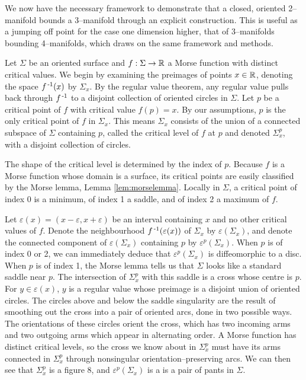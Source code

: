 \label{sec:2bound3}

We now have the necessary framework to demonstrate that a closed, oriented 2--manifold bounds a 3--manifold through an explicit construction.
This is useful as a jumping off point for the case one dimension higher, that of 3--manifolds bounding 4--manifolds, which draws on the same framework and methods.

Let $\Sigma$ be an oriented surface and $f:\Sigma\to\mathbb{R}$ a Morse function with distinct critical values.
We begin by examining the preimages of points $x\in\mathbb{R}$, denoting the space $f^{\,\text{-}1}(x)$ by $\Sigma_x$.
By the regular value theorem, any regular value pulls back through $f^{\,\text{-}1}$ to a disjoint collection of oriented circles in $\Sigma$.
Let $p$ be a critical point of $f$ with critical value $f(p)=x$.
By our assumptions, $p$ is the only critical point of $f$ in $\Sigma_x$.
This means $\Sigma_x$ consists of the union of a connected subspace of $\Sigma$ containing $p$, called the critical level of $f$ at $p$ and denoted $\Sigma_x^p$, with a disjoint collection of circles.

The shape of the critical level is determined by the index of $p$.
Because $f$ is a Morse function whose domain is a surface, its critical points are easily classified by the Morse lemma, Lemma \ref{lem:morselemma}.
Locally in $\Sigma$, a critical point of index 0 is a minimum, of index 1 a saddle, and of index 2 a maximum of $f$.

Let $\varepsilon(x)=(x-\varepsilon,x+\varepsilon)$ be an interval containing $x$ and no other critical values of $f$.
Denote the neighbourhood $f^{\,\text{-}1}(\varepsilon(x))$ of $\Sigma_x$ by $\varepsilon(\Sigma_x)$, and denote the connected component of $\varepsilon(\Sigma_x)$ containing $p$ by $\varepsilon^p(\Sigma_x)$.
When $p$ is of index 0 or 2, we can immediately deduce that $\varepsilon^p(\Sigma_x)$ is diffeomorphic to a disc.
When $p$ is of index 1, the Morse lemma tells us that $\Sigma$ looks like a standard saddle near $p$.
The intersection of $\Sigma_x^p$ with this saddle is a cross whose centre is $p$.
For $y\in\varepsilon(x)$, $y$ is a regular value whose preimage is a disjoint union of oriented circles.
The circles above and below the saddle singularity are the result of smoothing out the cross into a pair of oriented arcs, done in two possible ways.
The orientations of these circles orient the cross, which has two incoming arms and two outgoing arms which appear in alternating order.
A Morse function has distinct critical levels, so the cross we know about in $\Sigma_x^p$ must have its arms connected in $\Sigma_x^p$ through nonsingular orientation--preserving arcs.
We can then see that $\Sigma_x^p$ is a figure 8, and $\varepsilon^p(\Sigma_x)$ is a is a pair of pants in $\Sigma$.


